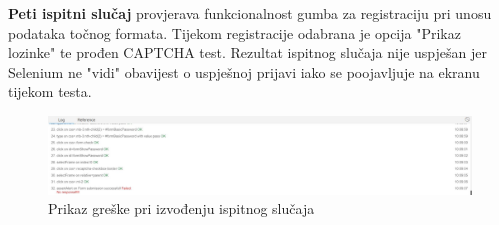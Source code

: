 			
\textbf{Peti ispitni slučaj} provjerava funkcionalnost gumba za registraciju pri unosu podataka točnog formata. Tijekom registracije odabrana je opcija "Prikaz lozinke" te prođen CAPTCHA test. Rezultat ispitnog slučaja nije uspješan jer Selenium ne "vidi" obavijest o uspješnoj prijavi iako se poojavljuje na ekranu tijekom testa.

			\begin{figure} [hbt!]
	\includegraphics[width=\linewidth]{Slike/registerError}
	\caption{Prikaz greške pri izvođenju ispitnog slučaja}
			\end{figure}
			
